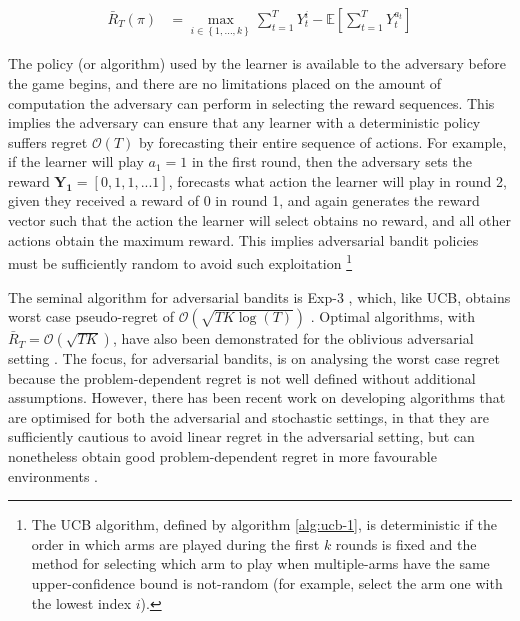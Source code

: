 \documentclass[11pt,a4paper,twoside]{report}
\newcommand{\E}[1]{\mathbb E\left[{#1}\right]}
\newcommand{\set}[1]{\left\{#1\right\}}
\newcommand{\eqn}[1]{\begin{align}#1\end{align}}
\newcommand{\bigo}[1]{\mathcal{O}\left( #1 \right)}
\newcommand{\cfb}[2]{{#1}_t^{#2}} %
\renewcommand{\vec}[1]{\boldsymbol{#1}}
\newcommand{\regret}{\bar{R}_{T}} %
\theoremstyle{plain}
\theoremstyle{definition}
\begin{document}
\eqn{
\label{eqn:pseudo_regret-adversarial}
\regret(\pi) &= \max_{i \in \set{1,...,k}}{\sum_{t=1}^T{\cfb{Y}{i}}} - \E{\sum_{t=1}^T{\cfb{Y}{a_t}}}
}

The policy (or algorithm) used by the learner is available to the adversary before the game begins, and there are no limitations placed on the amount of computation the adversary can perform in selecting the reward sequences. This implies the adversary can ensure that any learner with a deterministic policy suffers regret $\bigo{T}$ by forecasting their entire sequence of actions. For example, if the learner will play $a_1 = 1$ in the first round, then the adversary sets the reward $\vec{Y_1} = [0,1,1,...1]$, forecasts what action the learner will play in round 2, given they received a reward of 0 in round 1, and again generates the reward vector such that the action the learner will select obtains no reward, and all other actions obtain the maximum reward. This implies adversarial bandit policies must be sufficiently random to avoid such exploitation \footnote{The UCB algorithm, defined by algorithm \ref{alg:ucb-1}, is deterministic if the order in which arms are played during the first $k$ rounds is fixed and the method for selecting which arm to play when multiple-arms have the same upper-confidence bound is not-random (for example, select the arm one with the lowest index $i$).}

The seminal algorithm for adversarial bandits is Exp-3 \citep{Auer2002}, which, like UCB, obtains worst case pseudo-regret of $\bigo{\sqrt{TK\log(T)}}$  \citep{Auer1995}. Optimal algorithms, with $\regret = \bigo{\sqrt{TK}}$, have also been demonstrated for the oblivious adversarial setting \citep{Audibert2009}. The focus, for adversarial bandits, is on analysing the worst case regret because the problem-dependent regret is not well defined without additional assumptions. However, there has been recent work on developing algorithms that are optimised for both the adversarial and stochastic settings, in that they are sufficiently cautious to avoid linear regret in the adversarial setting, but can nonetheless obtain good problem-dependent regret in more favourable environments \citep{bubeck2012bothworlds,Auer2016}. 
\end{document}
